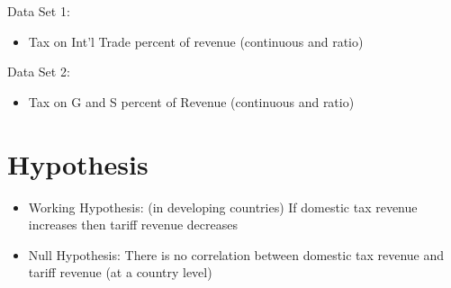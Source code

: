 \documentclass[12pt]{article}
\begin{document}
Data Set 1: 
\begin{itemize}
 \item Tax on Int'l Trade percent of revenue (continuous and ratio)
\end{itemize}
Data Set 2: 
\begin{itemize}
    \item Tax on G and S percent of Revenue (continuous and ratio)
\end{itemize}
\section{Hypothesis}
\begin{itemize}
    \item Working Hypothesis: (in developing countries) If domestic tax revenue increases then tariff revenue decreases
    \item Null Hypothesis: There is no correlation between domestic tax revenue and tariff revenue (at a country level)
\end{itemize}
\end{document}
